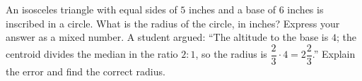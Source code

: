 An isosceles triangle with equal sides of $5$ inches and a base of $6$ inches is inscribed in a circle. What is the radius of the circle, in inches? Express your answer as a mixed number. A student argued: ``The altitude to the base is $4$; the centroid divides the median in the ratio $2:1$, so the radius is $\dfrac{2}{3}\cdot4=2\dfrac{2}{3}$.'' Explain the error and find the correct radius.
